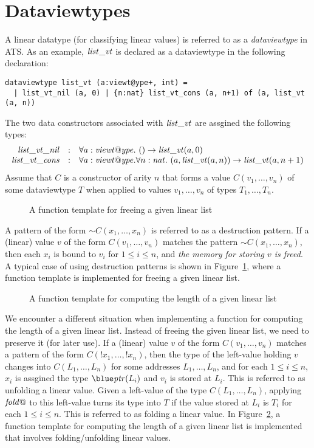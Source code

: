\section{Dataviewtypes}
A linear datatype (for classifying linear values) is referred to as a {\it
dataviewtype} in ATS. As an example, ${\it list\_vt}$ is declared as a
dataviewtype in the following declaration:
\begin{verbatim}
dataviewtype list_vt (a:viewt@ype+, int) =
  | list_vt_nil (a, 0) | {n:nat} list_vt_cons (a, n+1) of (a, list_vt (a, n))
\end{verbatim}
The two data constructors associated with ${\it list\_vt}$ are assgined the
following types:
\[\begin{array}{rcl}
{\it list\_vt\_nil} & : &
\forall a:{\it viewt@ype}.~()\rightarrow{\it list\_vt}(a, 0) \\
{\it list\_vt\_cons} & : &
\forall a:{\it viewt@ype}.\forall n:{\it nat}.~(a, {\it list\_vt}(a, n))\rightarrow{\it list\_vt}(a, n+1) \\
\end{array}\]
Assume that $C$ is a constructor of arity $n$ that forms a value
$C(v_1,\ldots,v_n)$ of some dataviewtype $T$ when applied to values
$v_1,\ldots,v_n$ of types $T_1,\ldots,T_n$.

\begin{figure}

\caption{A function template for freeing a given linear list}
\label{figure:list_vt_free.dats}
\end{figure}
A pattern of the form $\sim\!\!C(x_1,\ldots, x_n)$ is referred to as a
destruction pattern.  If a (linear) value $v$ of the form
$C(v_1,\ldots,v_n)$ matches the pattern $\sim\!\!C(x_1,\ldots, x_n)$, then
each $x_i$ is bound to $v_i$ for $1\leq i\leq n$, and {\em the memory for
storing $v$ is freed}. A typical case of using destruction patterns is
shown in Figure~\ref{figure:list_vt_free.dats}, where a function template
is implemented for freeing a given linear list.

\begin{figure}

\caption{A function template for computing the length of a given linear list}
\label{figure:list_vt_length.dats}
\end{figure}
We encounter a different situation when implementing a function for
computing the length of a given linear list. Instead of freeing the given
linear list, we need to preserve it (for later use). If a (linear) value
$v$ of the form $C(v_1,\ldots,v_n)$ matches a pattern of the form
$C(!x_1,\ldots,!x_n)$, then the type of the left-value holding $v$ changes
into $C(L_1,\ldots,L_n)$ for some addresses $L_1,\ldots,L_n$, and for each
$1\leq i\leq n$, $x_i$ is assgined the type $\tptr(L_i)$ and $v_i$ is
stored at $L_i$. This is referred to as unfolding a linear value.  Given a
left-value of the type $C(L_1,\ldots,L_n)$, applying ${\it fold@}$ to this
left-value turns its type into $T$ if the value stored at $L_i$ is $T_i$ for
each $1\leq i\leq n$. This is referred to as folding a linear value.  In
Figure~\ref{figure:list_vt_length.dats}, a function template for computing
the length of a given linear list is implemented that involves
folding/unfolding linear values.

